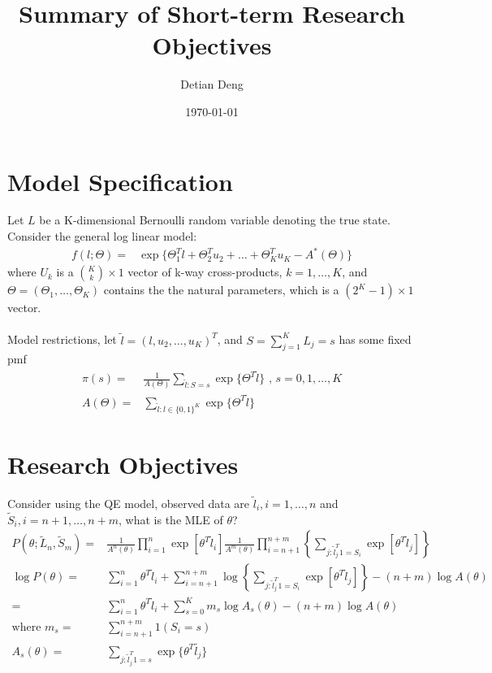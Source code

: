 \documentclass[11 pt, a4paper]{article}  %
\begin{document}
\title{Summary of Short-term Research Objectives}   %
\author{Detian Deng}         %
\date{\today}    %
\maketitle


\section{Model Specification}             %
Let $L$ be a K-dimensional Bernoulli random variable denoting the true state.
Consider the general log linear model:
\begin{align*}
f(l; \Theta) = & \exp \{\Theta_1^T l + \Theta_2^{T} u_2 + \ldots + \Theta_K^T u_K - A^*(\Theta)\}
\end{align*}
where $U_k$ is a ${K \choose k} \times 1$ vector of k-way cross-products, $k = 1,\ldots,K$,  and $\Theta = (\Theta_1,\ldots, \Theta_K)$ contains the the natural parameters, which is a $(2^K-1) \times 1$ vector.\\
\ \\
Model restrictions, let $\tilde{l} = (l,u_2,\dots,u_K)^T$, and $S = \sum_{j=1}^K L_j = s$ has some fixed pmf 
\begin{align}
\pi(s) = & \frac{1}{A(\Theta)} \sum_{\tilde{l}:S=s}\exp \{ \Theta^T \tilde{l}\}  \text{ , } s = 0,1,\ldots, K \\
A(\Theta) = & \sum_{\tilde{l}:l\in \{0,1\}^K}\exp \{ \Theta^T \tilde{l}\}
\end{align}

\newpage

\section{Research Objectives}
Consider using the QE model, observed data are $\tilde{l}_i,i=1,\ldots,n$ and $\tilde{S}_i,i=n+1,\ldots,n+m$, what is the MLE of $\theta$?
\begin{align*}
P(\theta;\tilde{L}_n,\tilde{S}_m) = & \frac{1}{A^n(\theta)} \prod_{i=1}^n \exp[\theta^T\tilde{l}_i] \frac{1}{A^m(\theta)} \prod_{i=n+1}^{n+m} \left \{ \sum_{j:\tilde{l}_j^T1=S_i} \exp [\theta^T\tilde{l}_j]\right \}\\
\log P(\theta) = & \sum_{i=1}^n \theta^T\tilde{l}_i + \sum_{i=n+1}^{n+m} \log \left \{ \sum_{j:\tilde{l}_j^T1=S_i} \exp [\theta^T\tilde{l}_j]\right \} - (n+m) \log A(\theta)\\
= & \sum_{i=1}^n \theta^T\tilde{l}_i + \sum_{s=0}^K m_s \log A_s(\theta) - (n+m) \log A(\theta)\\
\text{where }
m_s = & \sum_{i=n+1}^{n+m}1(S_i=s)\\
A_s(\theta) = & \sum_{j:\tilde{l}_j^T1=s}\exp \{ \theta^T \tilde{l_j}\}
\end{align*}
\end{document}
